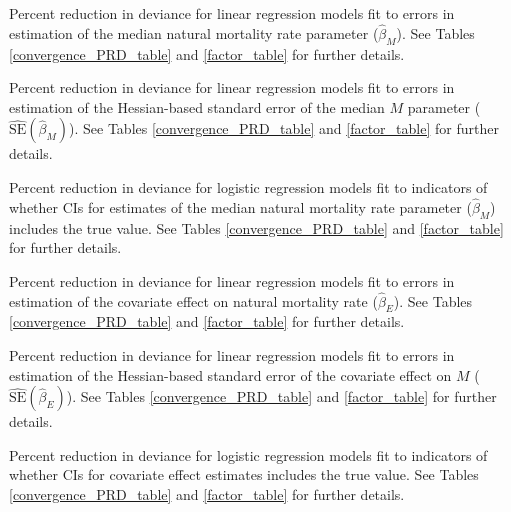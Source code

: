 \documentclass[
  12pt,
]{article}
\begin{document}
\begin{table}
\caption{Percent reduction in deviance for linear regression models fit to errors in estimation of the median natural mortality rate parameter ($\widehat \beta_M$). See Tables \ref{convergence_PRD_table} and \ref{factor_table} for further details.}\label{bias_median_M_converged_PRD_table}
{}
\end{table}
\pagebreak

\begin{table}
\caption{Percent reduction in deviance for linear regression models fit to errors in estimation of the Hessian-based standard error of the median $M$ parameter ($\widehat {\text{SE}}\left(\widehat \beta_M\right)$). See Tables \ref{convergence_PRD_table} and \ref{factor_table} for further details.}\label{median_M_se_bias_PRD_table}
{}
\end{table}
\pagebreak

\begin{table}
\caption{Percent reduction in deviance for logistic regression models fit to indicators of whether CIs for estimates of the median natural mortality rate parameter ($\widehat \beta_M$) includes the true value. See Tables \ref{convergence_PRD_table} and \ref{factor_table} for further details.}\label{mean_M_ci_coverage_PRD_table}
{}
\end{table}
\pagebreak

\begin{table}
\caption{Percent reduction in deviance for linear regression models fit to errors in estimation of the covariate effect on natural mortality rate ($\widehat \beta_E$). See Tables \ref{convergence_PRD_table} and \ref{factor_table} for further details.}\label{bias_ecov_beta_converged_PRD_table}
{}
\end{table}
\pagebreak

\begin{table}
\caption{Percent reduction in deviance for linear regression models fit to errors in estimation of the Hessian-based standard error of the covariate effect on $M$ ($\widehat {\text{SE}}\left(\widehat \beta_E\right)$). See Tables \ref{convergence_PRD_table} and \ref{factor_table} for further details.}\label{bias_ecov_beta_se_PRD_table}
{}
\end{table}
\pagebreak

\begin{table}
\caption{Percent reduction in deviance for logistic regression models fit to indicators of whether CIs for covariate effect estimates includes the true value. See Tables \ref{convergence_PRD_table} and \ref{factor_table} for further details.}\label{ecov_beta_ci_coverage_PRD_table}
{}
\end{table}
\pagebreak
\end{document}

